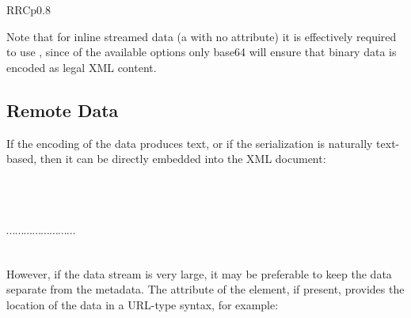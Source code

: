 \begin{tabular}{RRCp{0.8\textwidth}}
\begin{center}
{Note that for inline streamed data
(a  with no  attribute)
it is effectively required to use ,
since of the available options only base64 will ensure that
binary data is encoded as legal XML content.

\subsection{Remote Data}

If the encoding of the data produces text, or if the serialization
is naturally text-based, then it can be directly embedded into the
XML document:
\begin{plain}
\hspace*{0.5em}\\
\hspace*{1em}\\
\hspace*{1.5em}{\tt
\verb+AAAAAj/yVZiDGSSUwFZ6ypR4yGkADwAcQV0euAAIAAJBmMzNwZWZmkGle4tBR3jVQT9ocwAA+
}\\
\hspace*{1.5em} $\cdots\cdots\cdots\cdots\cdots\cdots\cdots\cdots$\\
\hspace*{1em}\\
\hspace*{0.5em}
\end{plain}

However, if the data stream is very large, it may be preferable to keep the data
separate from the metadata. The  attribute of
the {} element, if present, provides the location of the data
in a URL-type syntax, for example:

\begin{plain}

\par{}

\par{}

\par{}
\end{plain}


}
\end{center}
\end{tabular}
